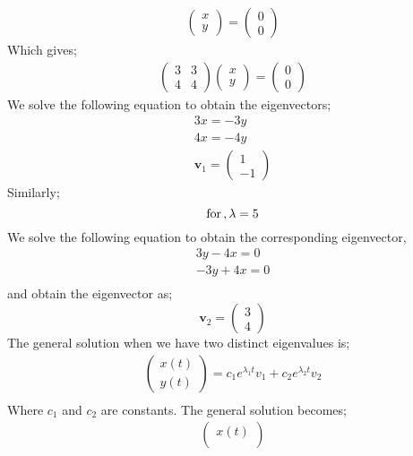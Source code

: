\documentclass[12pt,a4paper]{article}
\begin{document}
\begin{enumerate}
\begin{eqnarray*}
\begin{pmatrix}
x \\
y 
\end{pmatrix}=
\begin{pmatrix}
0 \\
0 
\end{pmatrix}
\end{eqnarray*}
Which gives;
\begin{eqnarray*}
\begin{pmatrix}
3 & 3\\
4 & 4
\end{pmatrix}
\begin{pmatrix}
x \\
y 
\end{pmatrix}=
\begin{pmatrix}
0 \\
0 
\end{pmatrix}
\end{eqnarray*}
We solve the following equation to obtain the eigenvectors;
\begin{eqnarray*}
3x=-3y\\
4x=-4y\\
\textbf{v}_1=\begin{pmatrix}
1 \\
-1 
\end{pmatrix}
\end{eqnarray*}
Similarly;
$$\text{for}\,, \lambda=5\\$$
We solve the following equation to obtain the corresponding eigenvector,
\begin{eqnarray*}
3y-4x=0\\
-3y+4x=0\\
\end{eqnarray*}
and obtain the eigenvector as;
$$\textbf{v}_2=\begin{pmatrix}
3 \\
4
\end{pmatrix} $$
The general solution when we have two distinct eigenvalues is;
\begin{eqnarray*}
\begin{pmatrix}
x(t) \\
y(t)
\end{pmatrix}=c_1e^{\lambda_1 t}v_1+c_2e^{\lambda_2 t}v_2\\
\end{eqnarray*}
Where $c_1$ and  $c_2$ are constants.
The general solution becomes;
\begin{eqnarray*}
\begin{pmatrix}
x(t) \\

\end{pmatrix}
\end{eqnarray*}
\end{enumerate}
\end{document}
